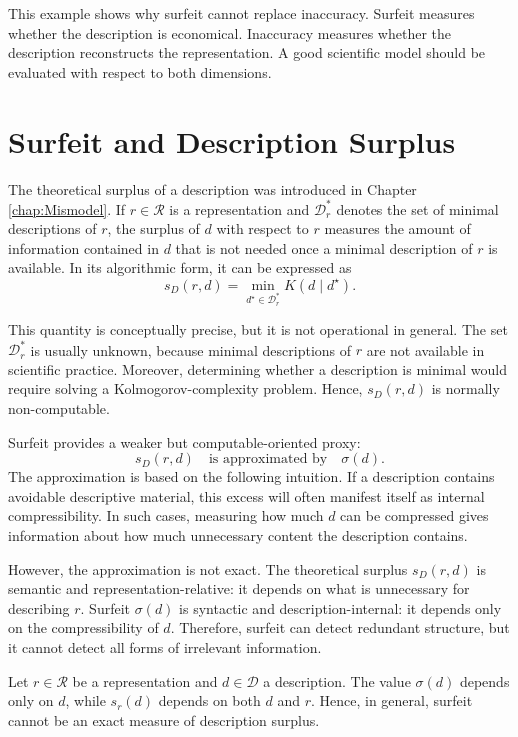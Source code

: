 This example shows why surfeit cannot replace inaccuracy. Surfeit measures whether the description is economical. Inaccuracy measures whether the description reconstructs the representation. A good scientific model should be evaluated with respect to both dimensions.

%
%

\section{Surfeit and Description Surplus}
\label{sec:surfeit_and_description_surplus}

The theoretical surplus of a description was introduced in Chapter \ref{chap:Mismodel}. If \(r\in\mathcal R\) is a representation and \(\mathcal D_r^\ast\) denotes the set of minimal descriptions of \(r\), the surplus of \(d\) with respect to \(r\) measures the amount of information contained in \(d\) that is not needed once a minimal description of \(r\) is available. In its algorithmic form, it can be expressed as
\[
s_D(r, d)=\min_{d^\star\in\mathcal D_r^\ast} K(d\mid d^\star).
\]

This quantity is conceptually precise, but it is not operational in general. The set \(\mathcal D_r^\ast\) is usually unknown, because minimal descriptions of \(r\) are not available in scientific practice. Moreover, determining whether a description is minimal would require solving a Kolmogorov-complexity problem. Hence, \(s_D(r, d)\) is normally non-computable.

Surfeit provides a weaker but computable-oriented proxy:
\[
s_D(r, d)
\quad\text{is approximated by}\quad
\sigma(d).
\]
The approximation is based on the following intuition. If a description contains avoidable descriptive material, this excess will often manifest itself as internal compressibility. In such cases, measuring how much \(d\) can be compressed gives information about how much unnecessary content the description contains.

However, the approximation is not exact. The theoretical surplus \(s_D(r, d)\) is semantic and representation-relative: it depends on what is unnecessary for describing \(r\). Surfeit \(\sigma(d)\) is syntactic and description-internal: it depends only on the compressibility of \(d\). Therefore, surfeit can detect redundant structure, but it cannot detect all forms of irrelevant information.

\begin{proposition}
\label{prop:surfeit_weak_proxy}
Let \(r\in\mathcal R\) be a representation and \(d\in\mathcal D\) a description. The value \(\sigma(d)\) depends only on \(d\), while \(s_r(d)\) depends on both \(d\) and \(r\). Hence, in general, surfeit cannot be an exact measure of description surplus.
\end{proposition}

